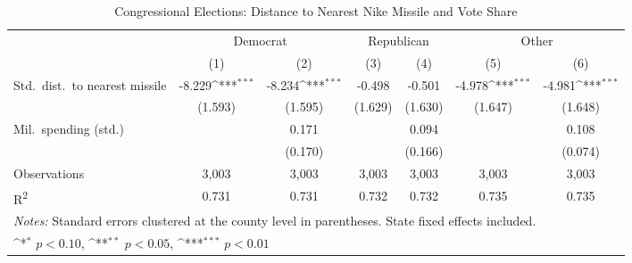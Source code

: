 \begin{table}[htbp]\centering
\setlength{\tabcolsep}{5pt}
\small
\def\sym#1{\ifmmode^{#1}\else\(^{#1}\)\fi}
\caption{Congressional Elections: Distance to Nearest Nike Missile and Vote Share}
\begin{tabular}{l*{6}{c}}
\toprule
                    &\multicolumn{2}{c}{Democrat}&\multicolumn{2}{c}{Republican}&\multicolumn{2}{c}{Other}\\
\cmidrule(lr){2-3}\cmidrule(lr){4-5}\cmidrule(lr){6-7}
                    &\multicolumn{1}{c}{(1)}&\multicolumn{1}{c}{(2)}&\multicolumn{1}{c}{(3)}&\multicolumn{1}{c}{(4)}&\multicolumn{1}{c}{(5)}&\multicolumn{1}{c}{(6)}\\
\midrule
Std.\ dist.\ to nearest missile
                    &      -8.229\sym{***}&      -8.234\sym{***}&      -0.498         &      -0.501         &      -4.978\sym{***}&      -4.981\sym{***}\\
                    &     (1.593)         &     (1.595)         &     (1.629)         &     (1.630)         &     (1.647)         &     (1.648)         \\
Mil.\ spending (std.)
                    &                     &       0.171         &                     &       0.094         &                     &       0.108         \\
                    &                     &     (0.170)         &                     &     (0.166)         &                     &     (0.074)         \\
\midrule
Observations        &       3,003         &       3,003         &       3,003         &       3,003         &       3,003         &       3,003         \\
R\textsuperscript{2}&       0.731         &       0.731         &       0.732         &       0.732         &       0.735         &       0.735         \\
\bottomrule
\multicolumn{7}{l}{\footnotesize \textit{Notes:} Standard errors clustered at the county level in parentheses. State fixed effects included.}\\
\multicolumn{7}{l}{\footnotesize \sym{*} \(p<0.10\), \sym{**} \(p<0.05\), \sym{***} \(p<0.01\)}\\
\end{tabular}
\end{table}
